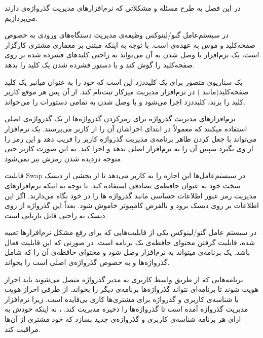 
در این فصل به طرح مسئله و مشکلاتی که نرم‌‌افزارهای مدیریت گذرواژه‌ی دارند می‌پردازیم.


در سیستم‌عامل گنو/لینوکس وظیفه‌ی مدیریت دستگاه‌های ورودی به خصوص صفحه‌کلید و موس به عهده‌ی  است. با توجه به اینکه  مبتنی بر معماری مشتری-کارگزار است، یک نرم‌افزار با وصل شدن به آن می‌تواند به راحتی کلید‌های فشرده شده بر روی صفحه‌کلید را گوش کند و یا دستور فشرده شدن یک کلید را بدهد. 

یک سناریوی متصور برای یک کلیددزد این است که خود را به عنوان میانبر یک کلید صفحه‌کلید(مانند ) در نرم‌افزار مدیریت میزکار ثبت‌نام کند. از آن پس هر موقع کاربر کلید  را بزند، کلیددزد اجرا می‌شود و با وصل شدن به  تمامی دستورات را می‌خواند.


نرم‌افزارهای مدیریت گذرواژه برای رمزکردن گذرواژه‌ها از یک گذرواژه‌ی اصلی استفاده میکنند که معمولاً در ابتدای اجراشان آن را از کاربر می‌پرسند. یک نرم‌افزار می‌تواند با جعل کردن ظاهر برنامه‌ی مدیریت گذرواژه کاربر را فریب دهد و این رمز را از وی بگیرد سپس آن را به نرم‌افزار اصلی بدهد و اجرا کند. به این صورت کاربر حتی متوجه دزدیده شدن رمزش نیز نمی‌شود.


قابلیت Swap در سیستم‌عامل‌ها این اجازه را به کاربر می‌دهد تا از بخشی از دیسک سخت خود به عنوان حافظه‌ی تصادفی استفاده کند. با توجه به اینکه نرم‌افزارهای مدیریت رمز عبور اطلاعات حساسی مانند گذرواژه ها را در خود نگاه می‌دارند. اگر این اطلاعات بر روی دیسک برود و بالفرض کامپیوتر خاموش شود. بعداً این گذرواژه از روی دیسک به راحتی قابل بازیابی است.


در سیستم عامل گنو/لینوکس یکی از قابلیت‌هایی که برای رفع مشکل نرم‌افزارها تعبیه شده، قابلیت گرفتن محتوای حافظه‌ی یک برنامه است. در صورتی که این قابلیت فعال باشد. یک برنامه‌ی  میتواند به نرم‌افزار وصل شود و محتوای حافظه‌ی آن را که شامل گذرواژه‌ها و به خصوص گذرواژه‌ی اصلی است را بخواند.


برنامه‌هایی که از طریق واسط کاربری به مدیر گذرواژه متصل می‌شوند باید احراز هویت شوند تا برنامه‌ای نتواند گذرواژه‌ها برنامه‌ی دیگر را بخواند. از طرفی احراز هویت با شناسه‌ی کاربری و گذرواژه برای مشتری‌ها کاری بی‌فایده است. زیرا نرم‌افزار مدیریت گذرواژه آمده است تا گذرواژه‌ها را ذخیره مدیریت کند. ، نه اینکه خودش به ازای هر برنامه شناسه‌ی کاربری و گذرواژه‌ی جدید بسازد که خود مشتری از آن‌ها مراقبت کند. 



